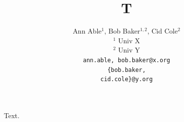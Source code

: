 \documentclass{article}
\begin{document}
\title{T}
\author{Ann Able$^1$, Bob Baker$^{1,2}$, Cid Cole$^2$ \\
$^1$ Univ X \\
$^2$ Univ Y \\
{\tt ann.able, bob.baker@x.org} \\
\texttt{\{bob.baker,}\\\texttt{cid.cole\}@y.org}}
\maketitle
Text.
\end{document}
